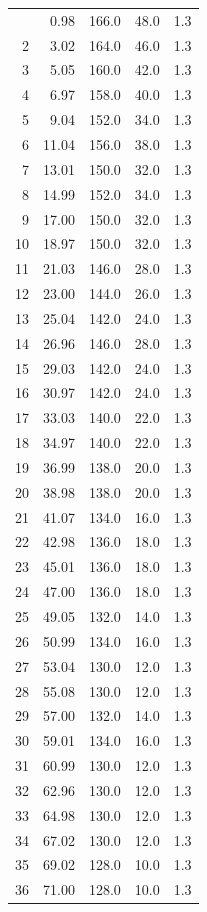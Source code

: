 \documentclass[11pt]{article}
\begin{document}
\begin{longtable}{@{}rrrrr@{}}
\bottomrule
\endlastfoot
1 & 0.98 & 166.0 & 48.0 & 1.3 \\
2 & 3.02 & 164.0 & 46.0 & 1.3 \\
3 & 5.05 & 160.0 & 42.0 & 1.3 \\
4 & 6.97 & 158.0 & 40.0 & 1.3 \\
5 & 9.04 & 152.0 & 34.0 & 1.3 \\
6 & 11.04 & 156.0 & 38.0 & 1.3 \\
7 & 13.01 & 150.0 & 32.0 & 1.3 \\
8 & 14.99 & 152.0 & 34.0 & 1.3 \\
9 & 17.00 & 150.0 & 32.0 & 1.3 \\
10 & 18.97 & 150.0 & 32.0 & 1.3 \\
11 & 21.03 & 146.0 & 28.0 & 1.3 \\
12 & 23.00 & 144.0 & 26.0 & 1.3 \\
13 & 25.04 & 142.0 & 24.0 & 1.3 \\
14 & 26.96 & 146.0 & 28.0 & 1.3 \\
15 & 29.03 & 142.0 & 24.0 & 1.3 \\
16 & 30.97 & 142.0 & 24.0 & 1.3 \\
17 & 33.03 & 140.0 & 22.0 & 1.3 \\
18 & 34.97 & 140.0 & 22.0 & 1.3 \\
19 & 36.99 & 138.0 & 20.0 & 1.3 \\
20 & 38.98 & 138.0 & 20.0 & 1.3 \\
21 & 41.07 & 134.0 & 16.0 & 1.3 \\
22 & 42.98 & 136.0 & 18.0 & 1.3 \\
23 & 45.01 & 136.0 & 18.0 & 1.3 \\
24 & 47.00 & 136.0 & 18.0 & 1.3 \\
25 & 49.05 & 132.0 & 14.0 & 1.3 \\
26 & 50.99 & 134.0 & 16.0 & 1.3 \\
27 & 53.04 & 130.0 & 12.0 & 1.3 \\
28 & 55.08 & 130.0 & 12.0 & 1.3 \\
29 & 57.00 & 132.0 & 14.0 & 1.3 \\
30 & 59.01 & 134.0 & 16.0 & 1.3 \\
31 & 60.99 & 130.0 & 12.0 & 1.3 \\
32 & 62.96 & 130.0 & 12.0 & 1.3 \\
33 & 64.98 & 130.0 & 12.0 & 1.3 \\
34 & 67.02 & 130.0 & 12.0 & 1.3 \\
35 & 69.02 & 128.0 & 10.0 & 1.3 \\
36 & 71.00 & 128.0 & 10.0 & 1.3 \\
\end{longtable}
\end{document}
